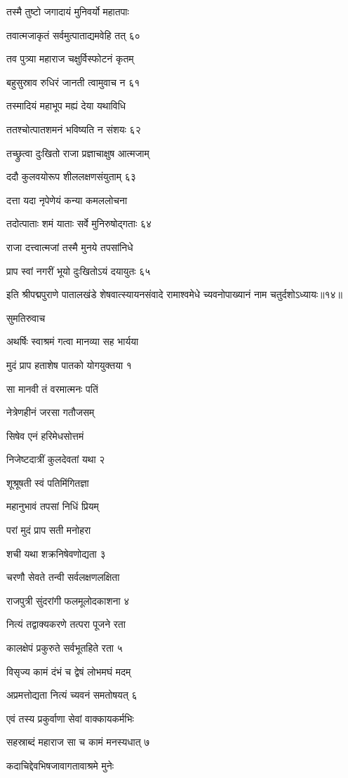 तस्मै तुष्टो जगादायं मुनिवर्यो महातपाः

तवात्मजाकृतं सर्वमुत्पाताद्यमवेहि तत् ६०

तव पुत्र्या महाराज चक्षुर्विस्फोटनं कृतम्

बहुसुस्राव रुधिरं जानती त्वामुवाच न ६१

तस्मादियं महाभूप मह्यं देया यथाविधि

ततश्चोत्पातशमनं भविष्यति न संशयः ६२

तच्छ्रुत्वा दुःखितो राजा प्रज्ञाचाक्षुष आत्मजाम्

ददौ कुलवयोरूप शीललक्षणसंयुताम् ६३

दत्ता यदा नृपेणेयं कन्या कमललोचना

तदोत्पाताः शमं याताः सर्वे मुनिरुषोद्गताः ६४

राजा दत्त्वात्मजां तस्मै मुनये तपसांनिधे

प्राप स्वां नगरीं भूयो दुःखितोऽयं दयायुतः ६५

इति श्रीपद्मपुराणे पातालखंडे शेषवात्स्यायनसंवादे रामाश्वमेधे च्यवनोपाख्यानं नाम चतुर्दशोऽध्यायः॥१४॥


सुमतिरुवाच

अथर्षिः स्वाश्रमं गत्वा मानव्या सह भार्यया

मुदं प्राप हताशेष पातको योगयुक्तया १

सा मानवी तं वरमात्मनः पतिं

नेत्रेणहीनं जरसा गतौजसम्

सिषेव एनं हरिमेधसोत्तमं

निजेष्टदात्रीं कुलदेवतां यथा २

शूश्रूषती स्वं पतिमिंगितज्ञा

महानुभावं तपसां निधिं प्रियम्

परां मुदं प्राप सती मनोहरा

शची यथा शक्रनिषेवणोद्यता ३

चरणौ सेवते तन्वी सर्वलक्षणलक्षिता

राजपुत्री सुंदरांगी फलमूलोदकाशना ४

नित्यं तद्वाक्यकरणे तत्परा पूजने रता

कालक्षेपं प्रकुरुते सर्वभूतहिते रता ५

विसृज्य कामं दंभं च द्वेषं लोभमघं मदम्

अप्रमत्तोद्यता नित्यं च्यवनं समतोषयत् ६

एवं तस्य प्रकुर्वाणा सेवां वाक्कायकर्मभिः

सहस्राब्दं महाराज सा च कामं मनस्यधात् ७

कदाचिद्देवभिषजावागतावाश्रमे मुनेः

